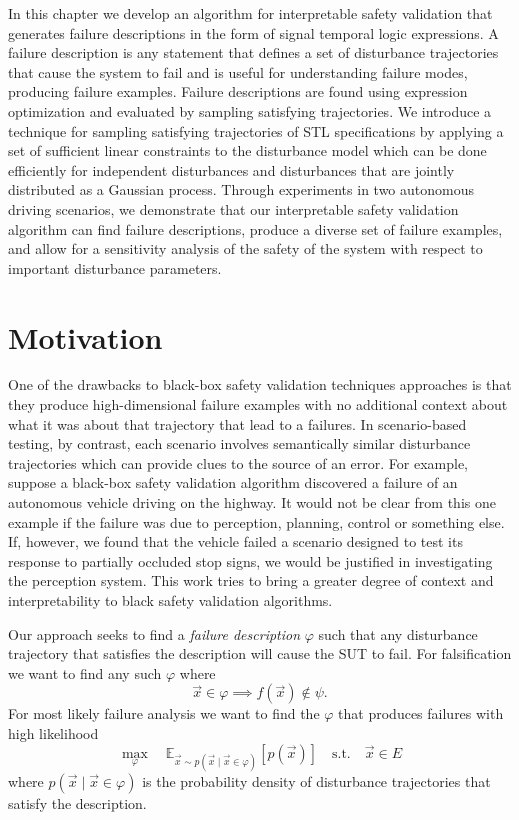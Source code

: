 In this chapter we develop an algorithm for interpretable safety validation that generates failure descriptions in the form of signal temporal logic expressions. A failure description is any statement that defines a set of disturbance trajectories that cause the system to fail and is useful for understanding failure modes, producing failure examples. Failure descriptions are found using expression optimization and evaluated by sampling satisfying trajectories. We introduce a technique for sampling satisfying trajectories of STL specifications by applying a set of sufficient linear constraints to the disturbance model which can be done efficiently for independent disturbances and disturbances that are jointly distributed as a Gaussian process. Through experiments in two autonomous driving scenarios, we demonstrate that our interpretable safety validation algorithm can find failure descriptions, produce a diverse set of failure examples, and allow for a sensitivity analysis of the safety of the system with respect to important disturbance parameters. 

\section{Motivation}

One of the drawbacks to black-box safety validation techniques approaches is that they produce high-dimensional failure examples with no additional context about what it was about that trajectory that lead to a failures. In scenario-based testing, by contrast, each scenario involves semantically similar disturbance trajectories which can provide clues to the source of an error. For example, suppose a black-box safety validation algorithm discovered a failure of an autonomous vehicle driving on the highway. It would not be clear from this one example if the failure was due to perception, planning, control or something else. If, however, we found that the vehicle failed a scenario designed to test its response to partially occluded stop signs, we would be justified in investigating the perception system. This work tries to bring a greater degree of context and interpretability to black safety validation algorithms. 

Our approach seeks to find a \emph{failure description} $\varphi$ such that any disturbance trajectory that satisfies the description will cause the SUT to fail. For falsification we want to find any such $\varphi$ where
\begin{equation}
    \vec{x} \in \varphi \implies f(\vec{x}) \not \in \psi \text{.}
\end{equation}
For most likely failure analysis we want to find the $\varphi$ that produces failures with high likelihood
\begin{equation}
\max_\varphi \quad \mathbb{E}_{\vec{x} \sim p(\vec{x} \mid \vec{x} \in \varphi)}[p(\vec{x})] \quad\textrm{s.t.}\quad \vec{x} \in E
\end{equation}
where $p(\vec{x} \mid \vec{x} \in \varphi)$ is the probability density of disturbance trajectories that satisfy the description. 

